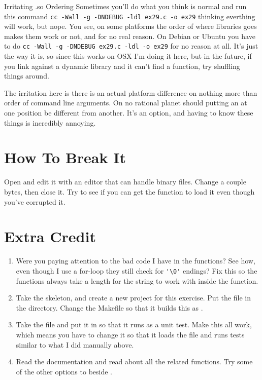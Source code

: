 \begin{aside}{Irritating .so Ordering}
Sometimes you'll do what you think is normal and run this command
\verb|cc -Wall -g -DNDEBUG -ldl ex29.c -o ex29| thinking everthing
will work, but nope.  You see, on some platforms the order of where 
libraries goes makes them work or not, and for no real reason.  On
Debian or Ubuntu you have to do
\verb|cc -Wall -g -DNDEBUG ex29.c -ldl -o ex29| for no reason at all.
It's just the way it is, so since this works on OSX I'm doing it
here, but in the future, if you link against a dynamic library and
it can't find a function, try shuffling things around.

The irritation here is there is an actual platform difference on nothing
more than order of command line arguments.  On no rational planet should
putting an  at one position be different from another.  It's an
option, and having to know these things is incredibly annoying.
\end{aside}

\section{How To Break It}

Open  and edit it with an editor that can handle
binary files.  Change a couple bytes, then close it.  Try to see
if you can get the  function to load it even though
you've corrupted it.

\section{Extra Credit}

\begin{enumerate}
\item Were you paying attention to the bad code I have in the  functions?
    See how, even though I use a for-loop they still check for \verb|'\0'|
    endings?  Fix this so the functions always take a length for the
    string to work with inside the function.
\item Take the  skeleton, and create a new project
    for this exercise.  Put the  file in the 
    directory.  Change the Makefile so that it builds this as .
\item Take the  file and put it in  so
    that it runs as a unit test.  Make this all work, which means you have to
    change it so that it loads the  file and runs
    tests similar to what I did manually above.
\item Read the  documentation and read about all the
    related functions.  Try some of the other options to 
    beside .
\end{enumerate}

